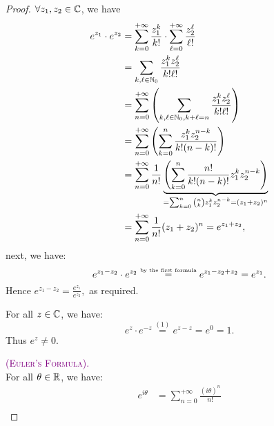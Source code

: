 \begin{proof}
\item[\ding{50} \ding{172}] $\forall z_1, z_2 \in   \mathbb{C}  $, we have
  \begin{align*}
    e^{z_1} \cdot  e^{z_2} &= \sum_{k=0}^{+\infty } \frac{z_1 ^{k}}{k!} 
  \cdot \sum_{\ell = 0}^{ +\infty }  
  \frac{z_2^{\ell }}{\ell !} \\ 
                           &=
                           \sum_{k, \ell \in   \mathbb{N}_0}^{} 
                           \frac{z_1^{k}z_2^{\ell }}{k! \ell !} \\
                           &=
                           \sum_{n=0}^{+\infty} 
                           \left( 
                             \sum_{k, \ell \in  \mathbb{N}_0, k + \ell  = n}^{} 
                             \frac{z_1^{k} z_2^{\ell }}{k! \ell !}
                           \right)  \\
                           &= 
                           \sum_{n=0}^{+\infty} \left( 
                             \sum_{k=0}^{n} 
                             \frac{z_1^{k}z_2^{n-k}}{k!(n-k)!} 
                           \right) \\
                           &= 
                           \sum_{n=0}^{+\infty} 
                           \frac{1}{n!}
                           \underbrace{
                           \left( 
                             \sum_{k=0}^{n} 
                             \frac{n!}{k!(n-k) !} 
                             z_1^{k} z_2^{n-k}
                           \right) 
                           }_{ = \sum_{k=0}^{n} \binom{n}{k} z_1^{k} z_2^{n-k} =(z_1 + z_2)^{n} }  
                           \\
                           &= 
                           \sum_{n=0}^{+\infty} \frac{1}{n!}(z_1 + z_2) ^n = e^{z_1 + z_2},
  \end{align*}
next, we have: 
\[
  e^{z_1 - z_2} \cdot e^{z_2} \overset{\text{\tiny by the first formula}  }{ = } e^{z_1 - z_2 + z_2} = e^{z_1}.
\]
Hence $e^{z_1 - z_2} = \frac{e^{z_1}}{e^{z_2}},$ as required. 
 \item[\ding{50} \ding{173}] 
   For all $z \in   \mathbb{C}  $, we have:
   \[
   e^{z} \cdot e^{-z} \overset{(1) }{=}  e^{z - z} = e^{0} = 1.
   \]
   Thus $e^{z} \neq 0 $.
   \item[\ding{50} \ding{174}] \textcolor{purple}{\textsc{(Euler's Formula).}}  \\
     For all $\theta \in  \mathbb{R}  $, we have:
     \begin{align*}
       e^{i \theta} &= \sum_{n=0}^{+\infty} \frac{(i \theta) ^n }{n!} \\

\end{align*}
\end{proof}
